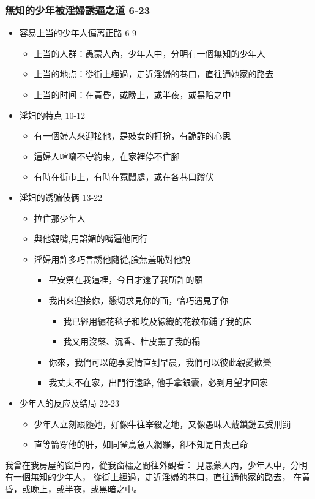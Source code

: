 \subsubsection{無知的少年被淫婦誘逼之道 6-23}
\begin{itemize}
\itemsep-.45em  
\item 容易上当的少年人偏离正路 6-9
\begin{itemize}
\itemsep-.45em  
\item \underline{上当的人群：}愚蒙人內，少年人中，分明有一個無知的少年人
\item \underline{上当的地点：}從街上經過，走近淫婦的巷口，直往通她家的路去
\item \underline{上当的时间：}在黃昏，或晚上，或半夜，或黑暗之中
\end{itemize}
\item 淫妇的特点 10-12
\begin{itemize}
\itemsep-.45em  
\item 有一個婦人來迎接他，是妓女的打扮，有詭詐的心思
\item 這婦人喧嚷不守約束，在家裡停不住腳
\item 有時在街市上，有時在寬闊處，或在各巷口蹲伏
\end{itemize}
\item 淫妇的诱骗伎俩 13-22
\begin{itemize}
\itemsep-.45em  
\item 拉住那少年人
\item 與他親嘴,用諂媚的嘴逼他同行
\item 淫婦用許多巧言誘他隨從,臉無羞恥對他說
\begin{itemize}
\itemsep-.45em  
\item 平安祭在我這裡，今日才還了我所許的願
\item 我出來迎接你，懇切求見你的面，恰巧遇見了你
\begin{itemize}
\itemsep-.45em  
\item 我已經用繡花毯子和埃及線織的花紋布鋪了我的床
\item 我又用沒藥、沉香、桂皮薰了我的榻
\end{itemize}
\item 你來，我們可以飽享愛情直到早晨，我們可以彼此親愛歡樂
\item 我丈夫不在家，出門行遠路, 他手拿銀囊，必到月望才回家
\end{itemize}
\end{itemize}
\item 少年人的反应及结局 22-23
\begin{itemize}
\itemsep-.45em  
\item 少年人立刻跟隨她，好像牛往宰殺之地，又像愚昧人戴鎖鏈去受刑罰
\item 直等箭穿他的肝，如同雀鳥急入網羅，卻不知是自喪己命
\end{itemize}
\end{itemize}
我曾在我房屋的窗戶內，從我窗櫺之間往外觀看：
見愚蒙人內，少年人中，分明有一個無知的少年人，
從街上經過，走近淫婦的巷口，直往通他家的路去，
在黃昏，或晚上，或半夜，或黑暗之中。

